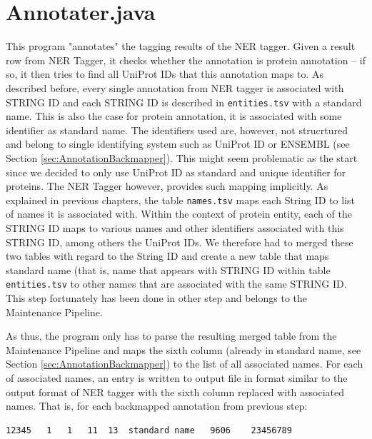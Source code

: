 
\section{Annotater.java}

This program "annotates" the tagging results of the NER tagger. Given a result row from NER Tagger, it checks whether the annotation is protein annotation -- if so, it then tries to find all UniProt IDs that this annotation maps to. As described before, every single annotation from NER tagger is associated with STRING ID and each STRING ID is described in \texttt{entities.tsv} with a standard name. This is also the case for protein annotation, it is associated with some identifier as standard name. The identifiers used are, however, not strucrtured and belong to single identifying system such as UniProt ID or ENSEMBL (see Section \ref{sec:AnnotationBackmapper}). This might seem problematic as the start since we decided to only use UniProt ID as standard and unique identifier for proteins. The NER Tagger however, provides such mapping implicitly. As explained in previous chapters, the table \texttt{names.tsv} maps each String ID to list of names it is associated with. Within the context of protein entity, each of the STRING ID maps to various names and other identifiers associated with this STRING ID, among others the UniProt IDs. We therefore had to merged these two tables with regard to the String ID and create a new table that maps standard name (that is, name that appears with STRING ID within table \texttt{entities.tsv} to other names that are associated with the same STRING ID. This step fortunately has been done in other step and belongs to the Maintenance Pipeline.

As thus, the program only has to parse the resulting merged table from the Maintenance Pipeline and maps the sixth column (already in standard name, see Section \ref{sec:AnnotationBackmapper}) to the list of all associated names. For each of associated names, an entry is written to output file in format similar to the output format of NER tagger with the sixth column replaced with associated names. That is, for each backmapped annotation from previous step:

\begin{lstlisting}[breaklines]
12345	1	1	11	13	standard name	9606	23456789
\end{lstlisting}

